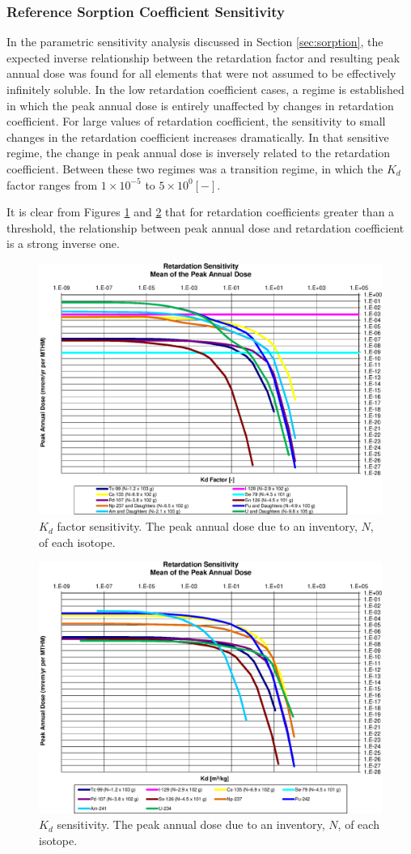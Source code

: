
\subsubsection{Reference Sorption Coefficient Sensitivity}

In the parametric sensitivity analysis discussed in Section \ref{sec:sorption}, 
the expected inverse relationship between the retardation factor and resulting 
peak annual dose was found for all elements that were not assumed to be 
effectively infinitely soluble. In the low retardation coefficient cases, a 
regime is established in which the peak annual dose is entirely unaffected by 
changes in retardation coefficient. For large values of retardation 
coefficient, the sensitivity to small changes in the retardation coefficient 
increases dramatically. In that sensitive regime, the change in peak annual 
dose is inversely related to the retardation coefficient. Between these two 
regimes was a transition regime, in which the $K_d$ factor ranges from 
$1\times10^{-5}$ to $5\times10^{0} [-]$.

It is clear from Figures \ref{fig:KdSumFactor} and \ref{fig:KdSum} that 
for retardation coefficients greater than a threshold, the 
relationship between peak annual dose and retardation coefficient is a strong 
inverse one. 

\begin{figure}[ht]
\centering
\includegraphics[width=0.7\linewidth]{./chapters/nuclide_sensitivity/clay/Sorption/Retardation_Summary_kdFactor.eps}
\caption{$K_d$ factor sensitivity.  The peak annual dose due to an inventory, 
$N$, of each isotope.}
\label{fig:KdSumFactor}
\end{figure}

\begin{figure}[ht]
\centering
\includegraphics[width=0.7\linewidth]{./chapters/nuclide_sensitivity/clay/Sorption/Retardation_Summary_kd.eps}
\caption{$K_d$ sensitivity.  The peak annual dose due to an inventory, 
$N$, of each isotope.}
\label{fig:KdSum}
\end{figure}

\clearpage
